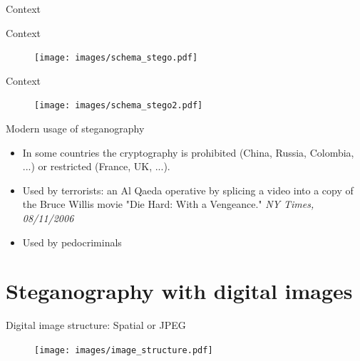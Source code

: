 \documentclass[10pt]{beamer}
\begin{document}
\begin{frame}{Context}
\end{frame}

\begin{frame}{Context}
\begin{figure}[h]
\texttt{[image: images/schema\_stego.pdf]}
\end{figure}
\end{frame}

\begin{frame}{Context}
\begin{figure}[h]
\texttt{[image: images/schema\_stego2.pdf]}
\end{figure}
\end{frame}

\begin{frame}{Modern usage of steganography}
\begin{itemize}
    \item In some countries the cryptography is prohibited (China, Russia, Colombia, ...) or restricted (France, UK, ...). 
    \item Used by terrorists: an Al Qaeda operative by splicing a video into a copy of the Bruce Willis movie "Die Hard:
    With a Vengeance." \textit{NY Times, 08/11/2006}
    \item Used by pedocriminals
\end{itemize}
\end{frame}




\section{Steganography with digital images}



\begin{frame}{Digital image structure: Spatial or JPEG}

\begin{figure}[h]
\texttt{[image: images/image\_structure.pdf]}
\end{figure}
\end{frame}
\end{document}

